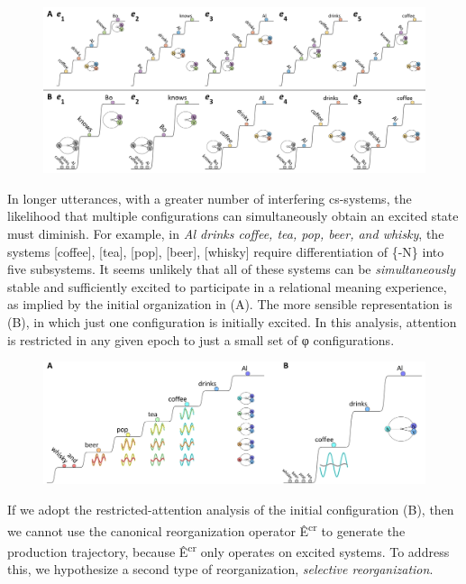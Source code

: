   
\begin{figure}
\includegraphics[width=\textwidth]{figures/Tilsen-img97.png}
\caption{\missingcaption}
\label{fig:}
\end{figure}
 

  In longer utterances, with a greater number of interfering cs-systems, the likelihood that multiple configurations can simultaneously obtain an excited state must diminish. For example, in \textit{Al drinks coffee, tea, pop, beer, and whisky}, the systems [coffee], [tea], [pop], [beer], [whisky] require differentiation of \{-N\} into five subsystems. It seems unlikely that all of these systems can be \textit{simultaneously} stable and sufficiently excited to participate in a relational meaning experience, as implied by the initial organization in (A). The more sensible representation is (B), in which just one configuration is initially excited. In this analysis, attention is restricted in any given epoch to just a small set of φ configurations.

  
\begin{figure}
\includegraphics[width=\textwidth]{figures/Tilsen-img98.png}
\caption{\missingcaption}
\label{fig:}
\end{figure}
 

  If we adopt the restricted-attention analysis of the initial configuration (B), then we cannot use the canonical reorganization operator Ê\textsuperscript{cr} to generate the production trajectory, because Ê\textsuperscript{cr} only operates on excited systems. To address this, we hypothesize a second type of reorganization, \textit{selective reorganization}.

